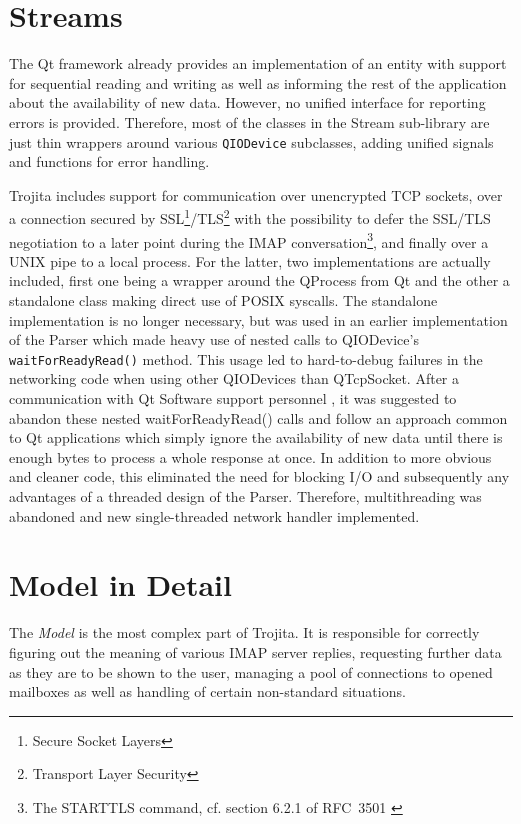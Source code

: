 \documentclass[12pt,notitlepage]{report}
\newcommand{\trojita}{Trojita\xspace}
\begin{document}
\section{Streams}

The Qt framework already provides an implementation of an entity with support
for sequential reading and writing as well as informing the rest of the
application about the availability of new data.  However, no unified interface
for reporting errors is provided.  Therefore, most of the classes in the Stream
sub-library are just thin wrappers around various {\tt QIODevice} subclasses,
adding unified signals and functions for error handling.

\trojita includes support for communication over unencrypted TCP sockets, over a
connection secured by SSL\footnote{Secure Socket Layers}/TLS\footnote{Transport
Layer Security} with the possibility to defer the SSL/TLS negotiation to a later
point during the IMAP conversation\footnote{The STARTTLS command, cf. section
6.2.1 of RFC~3501 \cite{rfc-imap}}, and finally over a UNIX pipe to a local
process.  For the latter, two implementations are actually included, first one
being a wrapper around the QProcess from Qt and the other a standalone class
making direct use of POSIX syscalls.  The standalone implementation is no longer
necessary, but was used in an earlier implementation of the Parser which made
heavy use of nested calls to QIODevice's {\tt waitForReadyRead()} method.  This
usage led to hard-to-debug failures in the networking code when using other
QIODevices than QTcpSocket.  After a communication with Qt Software support
personnel \cite{qt-qprocess-sigpipe}, it was suggested to abandon these nested
waitForReadyRead() calls and follow an approach common to Qt applications which
simply ignore the availability of new data until there is enough bytes to
process a whole response at once.  In addition to more obvious and cleaner code,
this eliminated the need for blocking I/O and subsequently any advantages of a
threaded design of the Parser.  Therefore, multithreading was abandoned and new
single-threaded network handler implemented.


\section{Model in Detail}
\label{model-in-detail}

The {\em Model} is the most complex part of \trojita.  It is responsible for
correctly figuring out the meaning of various IMAP server replies, requesting
further data as they are to be shown to the user, managing a pool of connections
to opened mailboxes as well as handling of certain non-standard situations.
\end{document}
